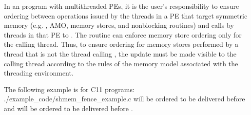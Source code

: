 \begin{apidefinition}
{    In an \openshmem program with multithreaded \acp{PE}, it is the
    user's responsibility to ensure ordering between operations issued by the threads
    in a \ac{PE} that target symmetric memory (e.g. \PUT{}, \ac{AMO}, memory stores,
    and nonblocking routines) and calls by threads in that \ac{PE} to
    . The  routine can enforce memory store ordering only for the
    calling thread. Thus, to ensure ordering for memory stores performed by a thread that is
    not the thread calling , the update must be made visible to the
    calling thread according to the rules of the memory model associated with
    the threading environment.
}

\begin{apiexamples}

\apicexample
    {The following  example is for C11 programs: }
    {./example_code/shmem_fence_example.c}
    { will be ordered to be delivered before  and 
    will be ordered to be delivered before .}

\end{apiexamples}

\end{apidefinition}
